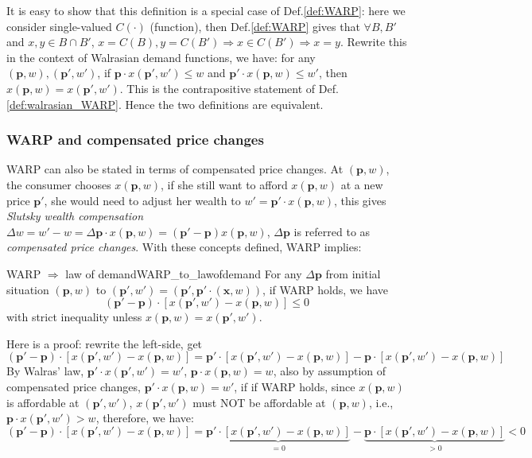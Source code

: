 It is easy to show that this definition is a special case of Def.\ref{def:WARP}: here we consider single-valued $C(\cdot)$ (function), then Def.\ref{def:WARP} gives that $\forall B,B'$ and $x,y\in B\cap B'$, $x=C(B),y=C(B')\Rightarrow x\in C(B')\Rightarrow x=y$. Rewrite this in the context of Walrasian demand functions, we have: for any $(\mathbf{p},w),(\mathbf{p}',w')$, if $\mathbf{p}\cdot x(\mathbf{p}',w')\leq w$ and $\mathbf{p}'\cdot  x(\mathbf{p},w)\leq w'$, then $ x(\mathbf{p},w)= x(\mathbf{p'},w')$. This is the contrapositive statement of Def.\ref{def:walrasian_WARP}. Hence the two definitions are equivalent.

\subsubsection*{WARP and compensated price changes}
WARP can also be stated in terms of compensated price changes. At $(\mathbf{p},w)$, the consumer chooses $ x(\mathbf{p},w)$, if she still want to afford $ x(\mathbf{p},w)$ at a new price $\mathbf{p}'$, she would need to adjust her wealth to $w'=\mathbf{p}'\cdot  x(\mathbf{p},w)$, this gives \textit{Slutsky wealth compensation} $\Delta w=w'-w=\Delta \mathbf{p}\cdot x(\mathbf{p},w)=(\mathbf{p}'-\mathbf{p}) x(\mathbf{p},w)$, $\Delta \mathbf{p}$ is referred to as \textit{compensated price changes}. With these concepts defined, WARP implies:
\begin{theorem}{WARP $\Rightarrow$ law of demand}{WARP_to_lawofdemand}
    For any $\Delta \mathbf{p}$ from initial situation $(\mathbf{p},w)$ to $(\mathbf{p}',w')=(\mathbf{p}',\mathbf{p}'\cdot(\mathbf{x},w))$, if WARP holds, we have
    $$(\mathbf{p}'-\mathbf{p})\cdot[ x(\mathbf{p}',w')- x(\mathbf{p},w)]\leq 0$$
    with strict inequality unless $ x(\mathbf{p},w)= x(\mathbf{p}',w')$.
\end{theorem}

Here is a proof: rewrite the left-side, get
$$(\mathbf{p}'-\mathbf{p})\cdot[ x(\mathbf{p}',w')- x(\mathbf{p},w)]=\mathbf{p}'\cdot[ x(\mathbf{p}',w')- x(\mathbf{p},w)]-\mathbf{p}\cdot[ x(\mathbf{p}',w')- x(\mathbf{p},w)]$$
By Walras' law, $\mathbf{p}'\cdot x(\mathbf{p}',w')=w'$, $\mathbf{p}\cdot  x(\mathbf{p},w)=w$, also by assumption of compensated price changes, $\mathbf{p}'\cdot x(\mathbf{p},w)=w'$, if if WARP holds, since $ x(\mathbf{p},w)$ is affordable at $(\mathbf{p}',w')$, $ x(\mathbf{p}',w')$ must NOT be affordable at $(\mathbf{p},w)$, i.e., $\mathbf{p}\cdot  x(\mathbf{p}',w')>w$, therefore, we have:
$$(\mathbf{p}'-\mathbf{p})\cdot[ x(\mathbf{p}',w')- x(\mathbf{p},w)]= \underbrace{\mathbf{p}'\cdot[ x(\mathbf{p}',w')- x(\mathbf{p},w)]}_{=0} - \underbrace{\mathbf{p}\cdot[ x(\mathbf{p}',w')- x(\mathbf{p},w)]}_{>0}<0$$

